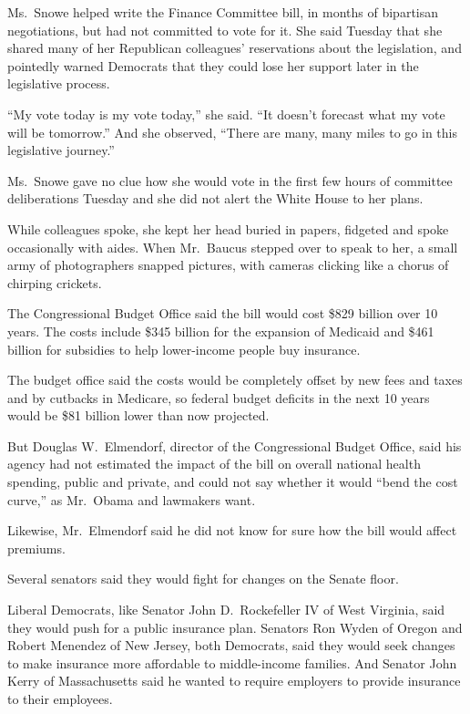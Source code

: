 ﻿\documentclass[12pt]{article}
\begin{document}
Ms.~Snowe helped write the Finance Committee bill, in months of bipartisan negotiations, but had not
committed to vote for it. She said Tuesday that she shared many of her Republican colleagues'
reservations about the legislation, and pointedly warned Democrats that they could lose her support
later in the legislative process.

``My vote today is my vote today,'' she said. ``It doesn't forecast what my vote will be tomorrow.''
And she observed, ``There are many, many miles to go in this legislative journey.''

Ms.~Snowe gave no clue how she would vote in the first few hours of committee deliberations Tuesday
and she did not alert the White House to her plans.

While colleagues spoke, she kept her head buried in papers, fidgeted and spoke occasionally with
aides. When Mr.~Baucus stepped over to speak to her, a small army of photographers snapped pictures,
with cameras clicking like a chorus of chirping crickets.

The Congressional Budget Office said the bill would cost \$829 billion over 10 years. The costs
include \$345 billion for the expansion of Medicaid and \$461 billion for subsidies to help
lower-income people buy insurance.

The budget office said the costs would be completely offset by new fees and taxes and by cutbacks in
Medicare, so federal budget deficits in the next 10 years would be \$81 billion lower than now
projected.

But Douglas W.~Elmendorf, director of the Congressional Budget Office, said his agency had not
estimated the impact of the bill on overall national health spending, public and private, and could
not say whether it would ``bend the cost curve,'' as Mr.~Obama and lawmakers want.

Likewise, Mr.~Elmendorf said he did not know for sure how the bill would affect premiums.

Several senators said they would fight for changes on the Senate floor.

Liberal Democrats, like Senator John D.~Rockefeller IV of West Virginia, said they would push for a
public insurance plan. Senators Ron Wyden of Oregon and Robert Menendez of New Jersey, both
Democrats, said they would seek changes to make insurance more affordable to middle-income families.
And Senator John Kerry of Massachusetts said he wanted to require employers to provide insurance to
their employees.
\end{document}
